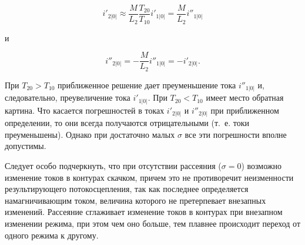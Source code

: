 \begin{equation}
    \label{eq:4-27 i2}
    i'_{2|0|} \approx \frac{M}{L_2}\frac{T_{20}}{T_{10}} i'_{1|0|} = \frac{M}{L_2} i''_{1|0|}
\end{equation}

и

\begin{equation}
    \label{eq:4-28 i2}
    i''_{2|0|} = -\frac{M}{L_2} i''_{1|0|} = -i'_{2|0|} \text{.}
\end{equation}

При $ T_{20} > T_{10} $ приближенное решение дает преуменьшение тока $ i''_{1|0|} $ и, следовательно, преувеличение тока $ i'_{1|0|} $. При $ T_{20} < T_{10} $ имеет место обратная картина. Что касается погрешностей в токах $ i'_{2|0|} $ и $ i''_{2|0|} $ при приближенном определении, то они всегда получаются отрицательными (т.~е. токи преуменьшены). Однако при достаточно малых $ \sigma $ все эти погрешности вполне допустимы.

Следует особо подчеркнуть, что при отсутствии рассеяния ($ \sigma = 0 $) возможно изменение токов в контурах скачком, причем это не противоречит неизменности результирующего потокосцепления, так как последнее определяется намагничивающим током, величина которого не претерпевает внезапных изменений. Рассеяние сглаживает изменение токов в контурах при внезапном изменении режима, при этом чем оно больше, тем плавнее происходит переход от одного режима к другому.

\addtocounter{example}{1}

